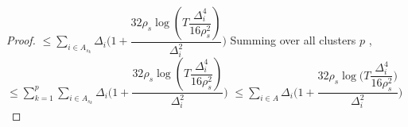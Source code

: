 \begin{proof}
\newline
\hspace*{12em}
$\leq\sum_{i\in A_{s_{k}}}\Delta_{i}\bigg(1+\dfrac{32\rho_{s}\log{(T\dfrac{\Delta_{i}^{4}}{16\rho_{s}^{2}})}}{\Delta_{i}^{2}}\bigg)$
\newline
Summing over all clusters $p$ ,
\newline
\hspace*{4em}$\leq\sum_{k=1}^{p}\sum_{i\in A_{s_{k}}}\Delta_{i}\bigg(1+\dfrac{32\rho_{s}\log{(T\dfrac{\Delta_{i}^{4}}{16\rho_{s}^{2}})}}{\Delta_{i}^{2}}\bigg)$
\newline
\hspace*{4em}$\leq\sum_{i\in A}\Delta_{i}\bigg(1+\dfrac{32\rho_{s}\log{(T\dfrac{\Delta_{i}^{4}}{16\rho_{s}^{2}}})}{\Delta_{i}^{2}}\bigg)$
\newline


\end{proof}
